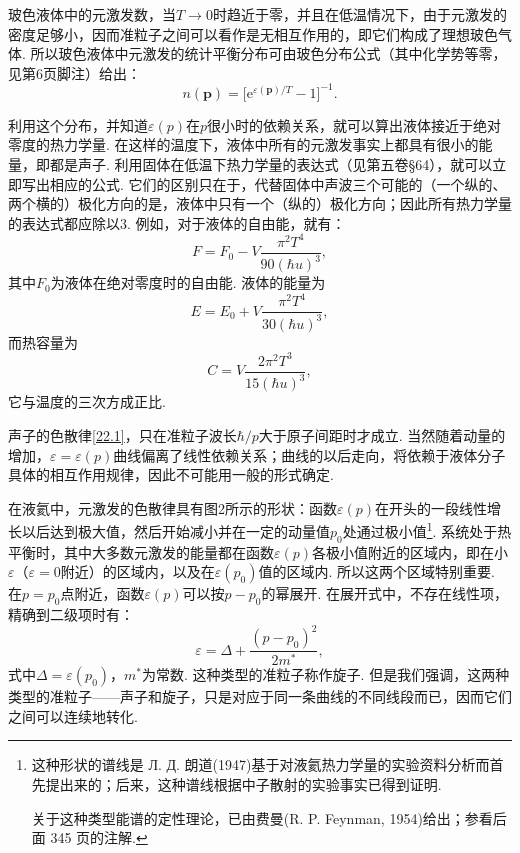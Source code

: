 玻色液体中的元激发数，当$T\to 0$时趋近于零，并且在低温情况下，由于元激发的密度足够小，因而准粒子之间可以看作是无相互作用的，即它们构成了理想玻色气体. 所以玻色液体中元激发的统计平衡分布可由玻色分布公式（其中化学势等零，见第6页脚注）给出：
\begin{equation}
n(\bm{p})=\bigl[\mathrm{e}^{\varepsilon(\bm{p})/T}-1\bigr]^{-1}.
\label{22.2}
\end{equation}

利用这个分布，并知道$\varepsilon(p)$在$p$很小时的依赖关系，就可以算出液体接近于绝对零度的热力学量. 在这样的温度下，液体中所有的元激发事实上都具有很小的能量，即都是声子. 利用固体在低温下热力学量的表达式（见第五卷§64），就可以立即写出相应的公式. 它们的区别只在于，代替固体中声波三个可能的（一个纵的、两个横的）极化方向的是，液体中只有一个（纵的）极化方向；因此所有热力学量的表达式都应除以3. 例如，对于液体的自由能，就有：
\begin{equation}
F=F_{0}-V\frac{\pi^{2}T^{4}}{90(\hbar u)^{3}},
\label{22.3}
\end{equation}
其中$F_{0}$为液体在绝对零度时的自由能. 液体的能量为
\begin{equation}
E=E_{0}+V\frac{\pi^{2}T^{4}}{30(\hbar u)^{3}},
\label{22.4}
\end{equation}
而热容量为
\begin{equation}
C=V\frac{2\pi^{2}T^{3}}{15(\hbar u)^{3}},
\label{22.5}
\end{equation}
它与温度的三次方成正比.

声子的色散律\eqref{22.1}，只在准粒子波长$\hbar/p$大于原子间距时才成立. 当然随着动量的增加，$\varepsilon=\varepsilon(p)$曲线偏离了线性依赖关系；曲线的以后走向，将依赖于液体分子具体的相互作用规律，因此不可能用一般的形式确定.

在液氦中，元激发的色散律具有图2所示的形状：函数$\varepsilon(p)$在开头的一段线性增长以后达到极大值，然后开始减小并在一定的动量值$p_{0}$处通过极小值\footnote{这种形状的谱线是 Л. Д. 朗道(1947)基于对液氦热力学量的实验资料分析而首先提出来的；后来，这种谱线根据中子散射的实验事实已得到证明.\par 关于这种类型能谱的定性理论，已由费曼(R. P. Feynman, 1954)给出；参看后面 345 页的注解.}. 系统处于热平衡时，其中大多数元激发的能量都在函数$\varepsilon(p)$各极小值附近的区域内，即在小$\varepsilon$（$\varepsilon=0$附近）的区域内，以及在$\varepsilon(p_{0})$值的区域内. 所以这两个区域特别重要. 在$p=p_{0}$点附近，函数$\varepsilon(p)$可以按$p-p_{0}$的幂展开. 在展开式中，不存在线性项，精确到二级项时有：
\begin{equation}
\varepsilon=\varDelta+\frac{(p-p_{0})^{2}}{2m^{*}},
\label{22.6}
\end{equation}
式中$\varDelta=\varepsilon(p_{0})$，$m^{*}$为常数. 这种类型的准粒子称作旋子. 但是我们强调，这两种类型的准粒子——声子和旋子，只是对应于同一条曲线的不同线段而已，因而它们之间可以连续地转化.

